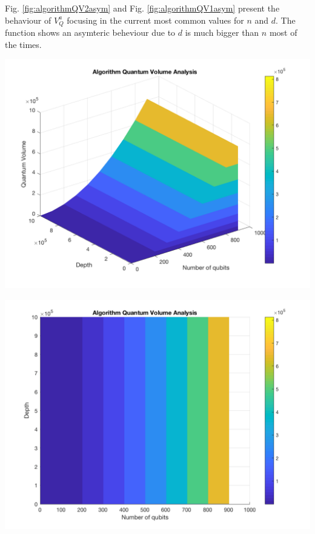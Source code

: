 \begin{itemize}
\begin{itemize}
\begin{itemize}
Fig. \ref{fig:algorithmQV2asym} and Fig. \ref{fig:algorithmQV1asym} present the behaviour of \(V_Q^a\)
focusing in the current most common values for \(n\) and \(d\).
The function shows an asymteric beheviour due to \(d\) is much bigger than \(n\) most of the times.



\begin{minipage}{.45\textwidth}

\centering

\begin{center}
\includegraphics[width=.9\linewidth]{figures/V_q_analysis_asym2.png}
\end{center}

\label{fig:algorithmQV2asym}

\end{minipage}%
\hspace{1cm}
\begin{minipage}{.45\textwidth}

\begin{center}
\includegraphics[width=.9\linewidth]{figures/V_q_analysis_asym1.png}
\end{center}


\end{minipage}
\end{itemize}
\end{itemize}
\end{itemize}
